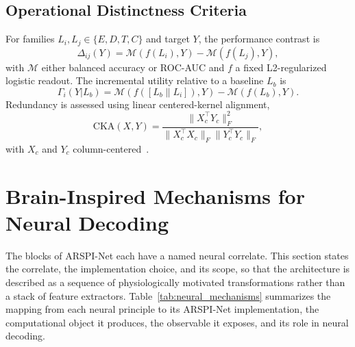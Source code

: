 \documentclass[journal]{IEEEtran}
\begin{document}
\subsection{Operational Distinctness Criteria}
For families $L_i,L_j\in\{E,D,T,C\}$ and target $Y$, the performance contrast is
\begin{equation}
\Delta_{ij}(Y)=\mathcal{M}(f(L_i),Y)-\mathcal{M}(f(L_j),Y),
\label{eq:contrast}
\end{equation}
with $\mathcal{M}$ either balanced accuracy or ROC-AUC and $f$ a fixed L2-regularized logistic readout. The incremental utility relative to a baseline $L_b$ is
\begin{equation}
\Gamma_i(Y|L_b)=\mathcal{M}(f([L_b\|L_i]),Y)-\mathcal{M}(f(L_b),Y).
\label{eq:increment}
\end{equation}
Redundancy is assessed using linear centered-kernel alignment,
\begin{equation}
\mathrm{CKA}(X,Y)=\frac{\|X_c^{\top}Y_c\|_F^2}{\|X_c^{\top}X_c\|_F\|Y_c^{\top}Y_c\|_F},
\label{eq:cka}
\end{equation}
with $X_c$ and $Y_c$ column-centered~\cite{kornblith2019similarity}.

\section{Brain-Inspired Mechanisms for Neural Decoding}\label{sec:mechanisms}

The blocks of ARSPI-Net each have a named neural correlate. This section states the correlate, the implementation choice, and its scope, so that the architecture is described as a sequence of physiologically motivated transformations rather than a stack of feature extractors. Table~\ref{tab:neural_mechanisms} summarizes the mapping from each neural principle to its ARSPI-Net implementation, the computational object it produces, the observable it exposes, and its role in neural decoding.


\end{document}
